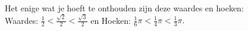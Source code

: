 \documentclass[preview]{standalone}
\begin{document}
\begin{center}
Het enige wat je hoeft te onthouden zijn deze waardes en hoeken: \\ Waardes: $\frac{1}{2} < \frac{\sqrt{2}}{2} < \frac{\sqrt{3}}{2}$ en Hoeken: $ \frac{1}{6} \pi < \frac{1}{4} \pi < \frac{1}{3} \pi.$
\end{center}
\end{document}
